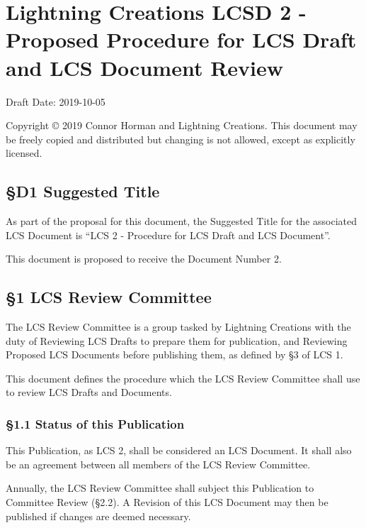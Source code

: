 \hypertarget{lightning-creations-lcsd-2---proposed-procedure-for-lcs-draft-and-lcs-document-review}{%
\section{Lightning Creations LCSD 2 - Proposed Procedure for LCS Draft
and LCS Document
Review}\label{lightning-creations-lcsd-2---proposed-procedure-for-lcs-draft-and-lcs-document-review}}

Draft Date: 2019-10-05

Copyright © 2019 Connor Horman and Lightning Creations. This document
may be freely copied and distributed but changing is not allowed, except
as explicitly licensed.

\hypertarget{d1-suggested-title}{%
\subsection{§D1 Suggested Title}\label{d1-suggested-title}}

As part of the proposal for this document, the Suggested Title for the
associated LCS Document is ``LCS 2 - Procedure for LCS Draft and LCS
Document''.

This document is proposed to receive the Document Number 2.

\hypertarget{lcs-review-committee}{%
\subsection{§1 LCS Review Committee}\label{lcs-review-committee}}

The LCS Review Committee is a group tasked by Lightning Creations with
the duty of Reviewing LCS Drafts to prepare them for publication, and
Reviewing Proposed LCS Documents before publishing them, as defined by
§3 of LCS 1.

This document defines the procedure which the LCS Review Committee shall
use to review LCS Drafts and Documents.

\hypertarget{status-of-this-publication}{%
\subsubsection{§1.1 Status of this
Publication}\label{status-of-this-publication}}

This Publication, as LCS 2, shall be considered an LCS Document. It
shall also be an agreement between all members of the LCS Review
Committee.

Annually, the LCS Review Committee shall subject this Publication to
Committee Review (§2.2). A Revision of this LCS Document may then be
published if changes are deemed necessary.

